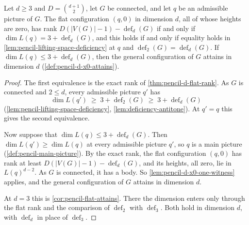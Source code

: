 \begin{corollary}
  \label{cor:pencil-d-flat-attains}
  \leanok
  Let $d \ge 3$ and $D = \binom{d+1}{2}$, let $G$ be connected, and let
  $q$ be an admissible picture of $G$. The flat configuration $(q, 0)$ in
  dimension $d$, all of whose heights are zero, has rank
  $D(|V(G)| - 1) - \operatorname{def}_d(G)$ if
  and only if $\dim L(q) = 3 + \operatorname{def}_d(G)$, and this holds
  if and only if equality holds in
  \cref{lem:pencil-lifting-space-deficiency} at $q$ and
  $\operatorname{def}_2(G) = \operatorname{def}_d(G)$. If
  $\dim L(q) \le 3 + \operatorname{def}_d(G)$, then the general
  configuration of $G$ attains in dimension $d$
  (\cref{def:pencil-d-x0-attains}).
\end{corollary}
\begin{proof}
  \leanok
  The first equivalence is the exact rank of
  \cref{thm:pencil-d-flat-rank}. As $G$ is connected and $2 \le d$, every
  admissible picture $q'$ has
  \[
    \dim L(q') \;\ge\; 3 + \operatorname{def}_2(G) \;\ge\;
    3 + \operatorname{def}_d(G)
  \]
  (\cref{lem:pencil-lifting-space-deficiency},
  \cref{lem:deficiency-antitone}). At $q' = q$ this gives the second
  equivalence.

  Now suppose that $\dim L(q) \le 3 + \operatorname{def}_d(G)$. Then
  $\dim L(q') \ge \dim L(q)$ at every admissible picture $q'$, so $q$ is
  a main picture (\cref{def:pencil-main-picture}). By the exact rank, the
  flat configuration $(q, 0)$ has rank at least
  $D(|V(G)| - 1) - \operatorname{def}_d(G)$, and its heights, all zero,
  lie in $L(q)^{d-2}$. As $G$ is connected, it has a body. So
  \cref{lem:pencil-d-x0-one-witness} applies, and the general
  configuration of $G$ attains in dimension $d$.

  At $d = 3$ this is \cref{cor:pencil-flat-attains}. There the dimension
  enters only through the flat rank and the comparison of
  $\operatorname{def}_2$ with $\operatorname{def}_3$. Both hold in
  dimension $d$, with $\operatorname{def}_d$ in place of
  $\operatorname{def}_3$.
\end{proof}

